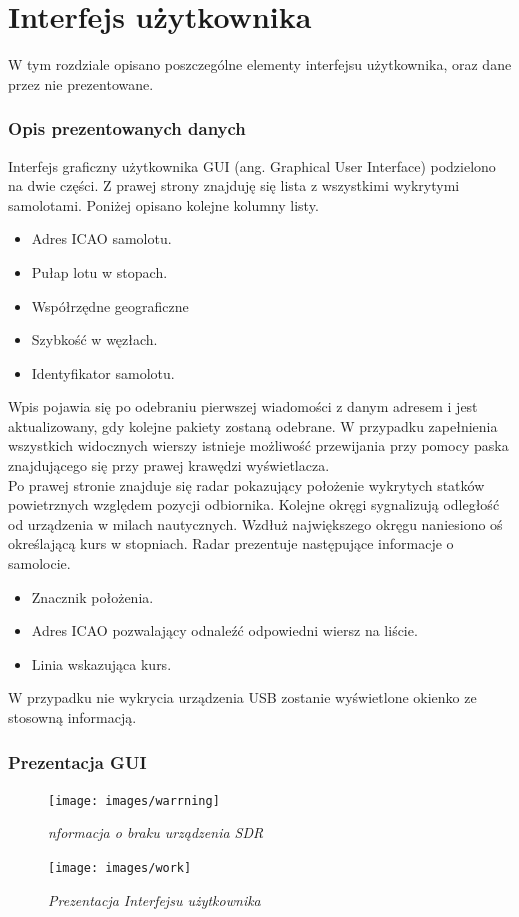 \documentclass[eng,printmode]{mgr}
\begin{document}
\chapter{Interfejs użytkownika}
W tym rozdziale opisano poszczególne elementy interfejsu użytkownika, oraz dane przez nie prezentowane.

\subsection*{Opis prezentowanych danych}
Interfejs graficzny użytkownika GUI (ang. Graphical User Interface) podzielono na dwie części. Z prawej strony znajduję się lista z wszystkimi wykrytymi samolotami. 
Poniżej opisano kolejne kolumny listy.
\begin{itemize}
\item Adres ICAO samolotu.
\item Pułap lotu w stopach.
\item Współrzędne geograficzne
\item Szybkość w węzłach.
\item Identyfikator samolotu.
\end{itemize}

Wpis pojawia się po odebraniu pierwszej wiadomości z danym adresem i jest aktualizowany, gdy kolejne pakiety zostaną odebrane. W przypadku zapełnienia wszystkich widocznych wierszy istnieje możliwość przewijania przy pomocy paska znajdującego się przy prawej krawędzi wyświetlacza.
\\

Po prawej stronie znajduje się radar pokazujący położenie wykrytych statków powietrznych względem pozycji odbiornika. Kolejne okręgi sygnalizują odległość od urządzenia w milach nautycznych. Wzdłuż największego okręgu naniesiono oś określającą kurs w stopniach. Radar prezentuje następujące informacje o samolocie.
\begin{itemize}
\item Znacznik położenia.
\item Adres ICAO pozwalający odnaleźć odpowiedni wiersz na liście.
\item Linia wskazująca kurs.
\end{itemize}
\skip 0.5cm


W przypadku nie wykrycia urządzenia USB zostanie wyświetlone okienko ze stosowną informacją.
\newpage
\subsection*{Prezentacja GUI}
\vskip 1cm
\begin{figure}[!h]
    \centering
    \texttt{[image: images/warrning]}
    \caption{\textit{nformacja o braku urządzenia SDR}}
\end{figure}
\vskip 1cm
\begin{figure}[!h]
    \centering
    \texttt{[image: images/work]}
    \caption{\textit{Prezentacja Interfejsu użytkownika}}
\end{figure}
\newpage
\end{document}
